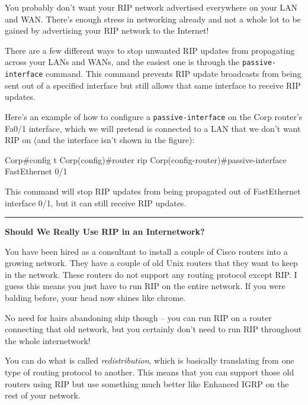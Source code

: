 You probably don't want your RIP network advertised everywhere on your
LAN and WAN. There's enough stress in networking already and not a whole
lot to be gained by advertising your RIP network to the Internet!

\protect\hypertarget{c09.xhtmlux5cux23Page_397}{}{}There are a few
different ways to stop unwanted RIP updates from propagating across your
LANs and WANs, and the easiest one is through the
\texttt{passive-interface} command. This command prevents RIP update
broadcasts from being sent out of a specified interface but still allows
that same interface to receive RIP updates.

Here's an example of how to configure a \texttt{passive-interface} on
the Corp router's Fa0/1 interface, which we will pretend is connected to
a LAN that we don't want RIP on (and the interface isn't shown in the
figure):

\begin{cli}
Corp#config t
Corp(config)#router rip
Corp(config-router)#passive-interface FastEthernet 0/1
\end{cli}

This command will stop RIP updates from being propagated out of
FastEthernet interface 0/1, but it can still receive RIP updates.

\begin{center}\rule{0.5\linewidth}{0.5pt}\end{center}

\textbf{Should We Really Use RIP in an Internetwork?}

You have been hired as a consultant to install a couple of Cisco routers
into a growing network. They have a couple of old Unix routers that they
want to keep in the network. These routers do not support any routing
protocol except RIP. I guess this means you just have to run RIP on the
entire network. If you were balding before, your head now shines like
chrome.

No need for hairs abandoning ship though -- you can run RIP on a router
connecting that old network, but you certainly don't need to run RIP
throughout the whole internetwork!

You can do what is called \emph{redistribution}, which is basically
translating from one type of routing protocol to another. This means
that you can support those old routers using RIP but use something much
better like Enhanced IGRP on the rest of your network.

